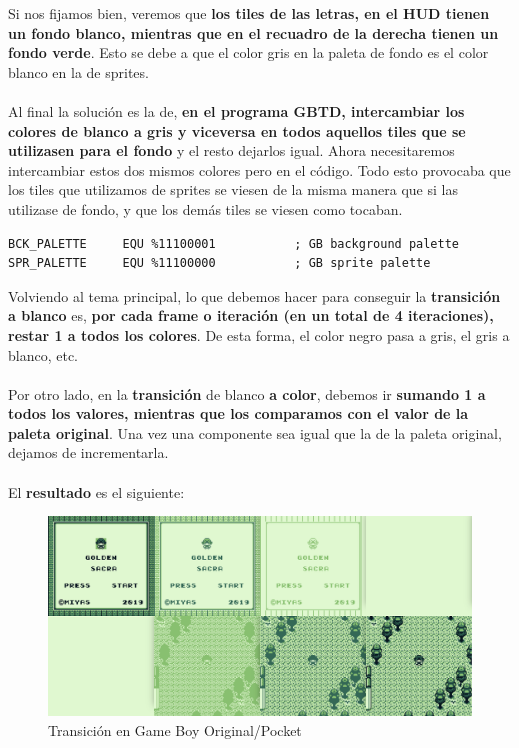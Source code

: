 Si nos fijamos bien, veremos que \textbf{los tiles de las letras, en el HUD tienen un fondo blanco, mientras que en el recuadro de la derecha tienen un fondo verde}. Esto se debe a que el color gris en la paleta de fondo es el color blanco en la de sprites.
\\ \\
Al final la solución es la de, \textbf{en el programa GBTD, intercambiar los colores de blanco a gris y viceversa en todos aquellos tiles que se utilizasen para el fondo} y el resto dejarlos igual. Ahora necesitaremos intercambiar estos dos mismos colores pero en el código. Todo esto provocaba que los tiles que utilizamos de sprites se viesen de la misma manera que si las utilizase de fondo, y que los demás tiles se viesen como tocaban.

\begin{lstlisting}[caption={Paleta de Color Invertida en GB}, label={code:gbpalinv}]
BCK_PALETTE 	EQU %11100001 			; GB background palette
SPR_PALETTE 	EQU %11100000 			; GB sprite palette
\end{lstlisting}

Volviendo al tema principal, lo que debemos hacer para conseguir la \textbf{transición a blanco} es, \textbf{por cada frame o iteración (en un total de 4 iteraciones), restar 1 a todos los colores}. De esta forma, el color negro pasa a gris, el gris a blanco, etc.
\\ \\
Por otro lado, en la \textbf{transición} de blanco \textbf{a color}, debemos ir \textbf{sumando 1 a todos los valores, mientras que los comparamos con el valor de la paleta original}. Una vez una componente sea igual que la de la paleta original, dejamos de incrementarla.
\\ \\
El \textbf{resultado} es el siguiente:

\begin{figure}[h]
\centering
\includegraphics[width=1\textwidth]{include/images/desarrollo/fadeinout_gb.png}
\caption{Transición en Game Boy Original/Pocket}
\label{figure:transitiongb}
\end{figure}

